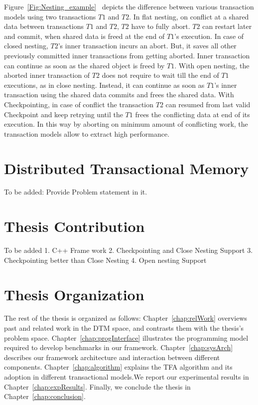 \documentclass[12pt,english]{report}
\begin{document}
Figure~\ref{Fig:Nesting_example}~\cite{Alex:ONTFA2367601} depicts the difference between various transaction models using two transactions $T1$ and $T2$. In flat nesting, on conflict at a shared data between transactions $T1$ and $T2$, $T2$ have to fully abort. $T2$ can restart later and commit, when shared data is freed at the end of $T1$'s execution. In case of closed nesting, $T2$'s inner transaction incurs an abort. But, it saves all other previously committed inner transactions from getting aborted. Inner transaction can continue as soon as the shared object is freed by $T1$. With open nesting, the aborted inner transaction of $T2$ does not require to wait till the end of $T1$ executions, as in close nesting. Instead, it can continue as soon as $T1$'s inner transaction using the shared data commits and frees the shared data. With Checkpointing, in case of conflict the transaction $T2$ can resumed from last valid Checkpoint and keep retrying until the $T1$ frees the conflicting data at end of its execution. In this way by aborting on minimum amount of conflicting work, the transaction models allow to extract high performance. 

\section{Distributed Transactional Memory}

To be added: Provide Problem statement in it.

\section{Thesis Contribution}

To be added
1. C++ Frame work
2. Checkpointing and Close Nesting Support 
3. Checkpointing better than Close Nesting
4. Open nesting Support

\section{Thesis Organization}

The rest of the thesis is organized as follows: Chapter~\ref{chap:relWork} overviews past and related work in the DTM space, and contrasts them with the thesis's problem space. Chapter~\ref{chap:progInterface} illustrates the programming model required to develop benchmarks in our framework. Chapter~\ref{chap:sysArch} describes our framework architecture and interaction between different components. Chapter~\ref{chap:algorithm} explains the TFA algorithm and its adoption in different transactional models.We report our experimental results in Chapter~\ref{chap:expResults}. Finally, we conclude the thesis in Chapter~\ref{chap:conclusion}.
\end{document}
